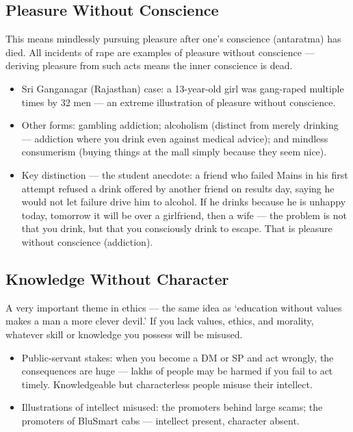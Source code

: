\subsection{Pleasure Without Conscience}

This means mindlessly pursuing pleasure after one's conscience (antaratma) has died. All incidents of rape are examples of pleasure without conscience --- deriving pleasure from such acts means the inner conscience is dead.

\begin{ExampleBox}
\begin{itemize}
\item Sri Ganganagar (Rajasthan) case: a 13-year-old girl was gang-raped multiple times by 32 men --- an extreme illustration of pleasure without conscience.
\item Other forms: gambling addiction; alcoholism (distinct from merely drinking --- addiction where you drink even against medical advice); and mindless consumerism (buying things at the mall simply because they seem nice).
\end{itemize}
\end{ExampleBox}

\begin{itemize}
\item Key distinction --- the student anecdote: a friend who failed Mains in his first attempt refused a drink offered by another friend on results day, saying he would not let failure drive him to alcohol. If he drinks because he is unhappy today, tomorrow it will be over a girlfriend, then a wife --- the problem is not that you drink, but that you consciously drink to escape. That is pleasure without conscience (addiction).
\end{itemize}

\subsection{Knowledge Without Character}

A very important theme in ethics --- the same idea as `education without values makes a man a more clever devil.' If you lack values, ethics, and morality, whatever skill or knowledge you possess will be misused.

\begin{itemize}
\item Public-servant stakes: when you become a DM or SP and act wrongly, the consequences are huge --- lakhs of people may be harmed if you fail to act timely. Knowledgeable but characterless people misuse their intellect.
\item Illustrations of intellect misused: the promoters behind large scams; the promoters of BluSmart cabs --- intellect present, character absent.
\end{itemize}


